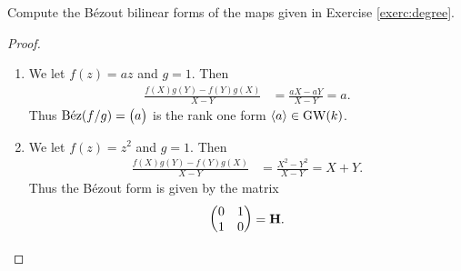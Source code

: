 \documentclass[english]{article}
\begin{document}
\begin{exercise} Compute the B\'ezout bilinear forms of the maps given in Exercise \ref{exerc:degree}.
\end{exercise}
\begin{proof} $\ $
\begin{enumerate}
    \item We let $f(z) = az$ and $g = 1$. Then
    \begin{align*}
        \frac{f(X)g(Y) - f(Y)g(X)}{X-Y} &= \frac{aX - aY}{X-Y} = a.
    \end{align*}
    Thus $\text{B\'ez}(f/g) = \begin{pmatrix} a \end{pmatrix}$ is the rank one form $\left\langle a \right\rangle \in \text{GW}(k)$.

    \item We let $f(z) = z^2$ and $g=1$. Then
    \begin{align*}
        \frac{f(X)g(Y) - f(Y)g(X)}{X-Y} &= \frac{X^2 - Y^2}{X-Y} = X + Y.
    \end{align*}
    Thus the B\'ezout form is given by the matrix
    \begin{align*}
        \begin{pmatrix} 0  & 1 \\ 1 & 0\end{pmatrix} = \textbf{H}.
    \end{align*}
    
\end{enumerate}

\end{proof}
\end{document}

